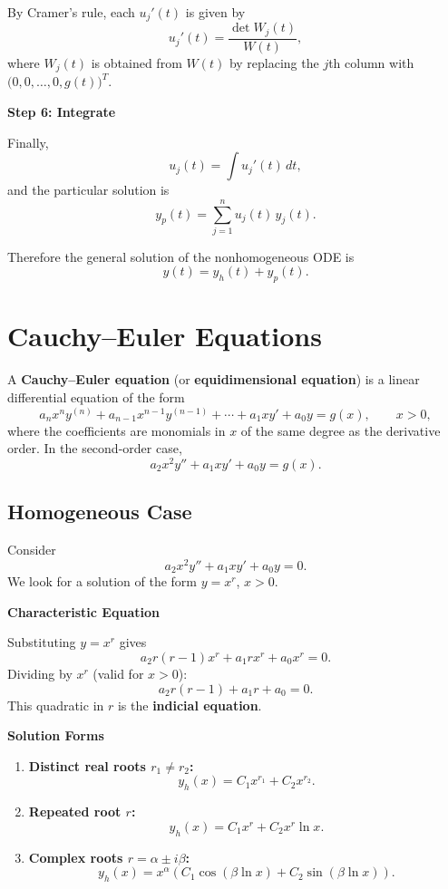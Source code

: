   By Cramer's rule, each $u_{j}'(t)$ is given by
  \[
    u_{j}'(t) = \frac{\det W_{j}(t)}{W(t)},
  \]
  where $W_{j}(t)$ is obtained from $W(t)$ by replacing the $j$th column with $\big(0,0,\ldots,0,g(t)\big)^{T}$.

  \textbf{Step 6: Integrate}
  
  Finally,
  \[
    u_{j}(t) = \int u_{j}'(t)\,dt,
  \]
  and the particular solution is
  \[
    y_{p}(t) = \sum_{j=1}^{n} u_{j}(t)\,y_{j}(t).
  \]
  
  Therefore the general solution of the nonhomogeneous ODE is
  \[
  y(t) = y_{h}(t) + y_{p}(t).
  \]



\section{Cauchy--Euler Equations}
  A \textbf{Cauchy--Euler equation} (or \textbf{equidimensional equation}) is a linear differential equation of the form
  \[
  a_n x^n y^{(n)} + a_{n-1}x^{n-1} y^{(n-1)} + \cdots + a_1 x y' + a_0 y = g(x), \qquad x>0,
  \]
  where the coefficients are monomials in $x$ of the same degree as the derivative order.  
  In the second-order case,
  \[
  a_2 x^2 y'' + a_1 x y' + a_0 y = g(x).
  \]

  \subsection{Homogeneous Case}
    Consider
    \[
    a_2 x^2 y'' + a_1 x y' + a_0 y = 0.
    \]
    We look for a solution of the form $y = x^r$, $x>0$.

    \textbf{Characteristic Equation}

    Substituting $y=x^r$ gives
    \[
    a_2 r(r-1)x^r + a_1 r x^r + a_0 x^r = 0.
    \]
    Dividing by $x^r$ (valid for $x>0$):
    \[
    a_2 r(r-1) + a_1 r + a_0 = 0.
    \]
    This quadratic in $r$ is the \textbf{indicial equation}.  

    \textbf{Solution Forms}

    \begin{enumerate}
      \item \textbf{Distinct real roots $r_1\neq r_2$:}  
      \[
      y_h(x) = C_1 x^{r_1} + C_2 x^{r_2}.
      \]
      \item \textbf{Repeated root $r$:}  
      \[
      y_h(x) = C_1 x^r + C_2 x^r \ln x.
      \]
      \item \textbf{Complex roots $r=\alpha \pm i\beta$:}  
      \[
      y_h(x) = x^\alpha \left( C_1 \cos(\beta \ln x) + C_2 \sin(\beta \ln x) \right).
      \]
    \end{enumerate}

